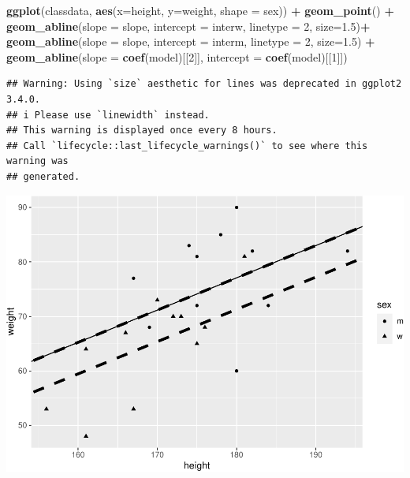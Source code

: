 \documentclass[
  doc]{apa6}
\newenvironment{Shaded}{\begin{snugshade}}{\end{snugshade}}
\newcommand{\AttributeTok}[1]{\textcolor[rgb]{0.13,0.29,0.53}{#1}}
\newcommand{\DecValTok}[1]{\textcolor[rgb]{0.00,0.00,0.81}{#1}}
\newcommand{\FloatTok}[1]{\textcolor[rgb]{0.00,0.00,0.81}{#1}}
\newcommand{\FunctionTok}[1]{\textcolor[rgb]{0.13,0.29,0.53}{\textbf{#1}}}
\newcommand{\NormalTok}[1]{#1}
\newcommand{\SpecialCharTok}[1]{\textcolor[rgb]{0.81,0.36,0.00}{\textbf{#1}}}
\begin{document}
\begin{Shaded}
\begin{Highlighting}[]
\FunctionTok{ggplot}\NormalTok{(classdata, }\FunctionTok{aes}\NormalTok{(}\AttributeTok{x=}\NormalTok{height, }\AttributeTok{y=}\NormalTok{weight, }\AttributeTok{shape =}\NormalTok{ sex)) }\SpecialCharTok{+}
  \FunctionTok{geom\_point}\NormalTok{() }\SpecialCharTok{+}
  \FunctionTok{geom\_abline}\NormalTok{(}\AttributeTok{slope =}\NormalTok{ slope, }\AttributeTok{intercept =}\NormalTok{ interw, }\AttributeTok{linetype =} \DecValTok{2}\NormalTok{, }\AttributeTok{size=}\FloatTok{1.5}\NormalTok{)}\SpecialCharTok{+}
  \FunctionTok{geom\_abline}\NormalTok{(}\AttributeTok{slope =}\NormalTok{ slope, }\AttributeTok{intercept =}\NormalTok{ interm, }\AttributeTok{linetype =} \DecValTok{2}\NormalTok{, }\AttributeTok{size=}\FloatTok{1.5}\NormalTok{) }\SpecialCharTok{+}
  \FunctionTok{geom\_abline}\NormalTok{(}\AttributeTok{slope =} \FunctionTok{coef}\NormalTok{(model)[[}\DecValTok{2}\NormalTok{]], }\AttributeTok{intercept =} \FunctionTok{coef}\NormalTok{(model)[[}\DecValTok{1}\NormalTok{]]) }
\end{Highlighting}
\end{Shaded}

\begin{verbatim}
## Warning: Using `size` aesthetic for lines was deprecated in ggplot2 3.4.0.
## i Please use `linewidth` instead.
## This warning is displayed once every 8 hours.
## Call `lifecycle::last_lifecycle_warnings()` to see where this warning was
## generated.
\end{verbatim}

\includegraphics{rmd_reg_files/figure-latex/unnamed-chunk-12-1.pdf}
\end{document}
